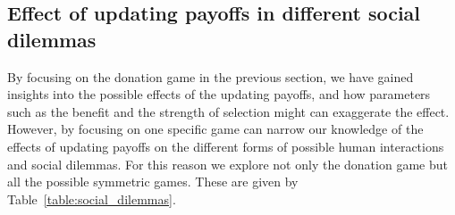 \documentclass[11pt]{article}
\theoremstyle{plainCl1}
\theoremstyle{plainCl2}
\begin{document}
\subsection{Effect of updating payoffs in different social dilemmas}\label{section:2_by_2_games}

By focusing on the donation game in the previous section, we have gained
insights into the possible effects of the updating payoffs, and how parameters
such as the benefit and the strength of selection might can exaggerate the
effect. However, by focusing on one specific game can narrow our knowledge of
the effects of updating payoffs on the different forms of possible human
interactions and social dilemmas. For this reason we explore not only the 
donation game but all the possible symmetric games. These are given by
Table~\ref{table:social_dilemmas}.

\begin{table}[!htbp]
  \begin{center}
  \end{center}
  \caption{\textbf{Social dilemmas and payoffs' constrains}. The various social
  dilemmas we explore in this work. Results for cases (i) - (iv) are presented
  in section~\ref{section:2_by_2_games} and results for case (v) are presented
  in section~\ref{section:donation}.}
  \label{table:social_dilemmas}
\end{table}


\end{document}
